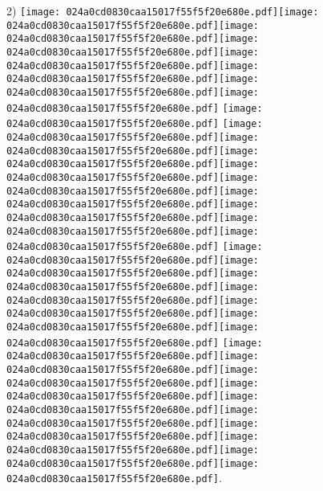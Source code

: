 \documentclass{article}
\newcommand{\origpg}[2]{\texttt{[image: 024a0cd0830caa15017f55f5f20e680e.pdf]}}
\begin{document}
{\vspace{0.385pt}\hspace{18.094pt}2) \origpg5{121.46pt 587.48pt 133.12pt 603.63pt}\origpg5{133.02pt 587.48pt 141.09pt 603.63pt}\origpg5{141.19pt 587.48pt 149.26pt 603.63pt}\hspace{-0.113pt}\origpg5{149.14pt 587.48pt 156.76pt 603.63pt}\origpg5{156.84pt 587.48pt 164.01pt 603.63pt}\hspace{-0.178pt}\origpg5{163.83pt 587.48pt 171.9pt 603.63pt}\hspace{-0.113pt}\origpg5{171.79pt 587.48pt 179.63pt 603.63pt}\hspace{-0.129pt}\origpg5{179.5pt 587.48pt 186.67pt 603.63pt} \origpg5{190.58pt 587.48pt 199.21pt 603.63pt} \origpg5{203.33pt 587.48pt 211.4pt 603.63pt}\hspace{-0.113pt}\origpg5{211.28pt 587.48pt 219.5pt 603.63pt}\hspace{-0.258pt}\origpg5{219.24pt 587.48pt 227.31pt 603.63pt}\origpg5{227.41pt 587.48pt 234.57pt 603.63pt}\origpg5{234.62pt 587.48pt 242.84pt 603.63pt}\origpg5{242.84pt 587.48pt 250.91pt 603.63pt}\hspace{-0.387pt}\origpg5{250.52pt 587.48pt 257.57pt 603.63pt}\origpg5{257.51pt 587.48pt 265.35pt 603.63pt}\hspace{-0.371pt}\origpg5{264.98pt 587.48pt 272.15pt 603.63pt} \origpg5{276.28pt 587.48pt 284.35pt 603.63pt}\hspace{-0.355pt}\origpg5{284pt 587.48pt 291.16pt 603.63pt}\origpg5{291.21pt 587.48pt 299.27pt 603.63pt}\origpg5{299.17pt 587.48pt 307.24pt 603.63pt}\hspace{-0.113pt}\origpg5{307.13pt 587.48pt 314.74pt 603.63pt}\origpg5{314.82pt 587.48pt 323.46pt 603.63pt}\origpg5{323.46pt 587.48pt 332.09pt 603.63pt} \origpg5{336.24pt 587.48pt 343.41pt 603.63pt}\origpg5{343.46pt 587.48pt 351.53pt 603.63pt}\hspace{-0.839pt}\origpg5{350.69pt 587.48pt 358.76pt 603.63pt}\hspace{-1.324pt}\origpg5{357.43pt 587.48pt 365.65pt 603.63pt}\origpg5{365.65pt 587.48pt 372.82pt 603.63pt}\origpg5{372.82pt 587.48pt 380.89pt 603.63pt}\hspace{0.145pt}\origpg5{381.03pt 587.48pt 388.2pt 603.63pt}\hspace{-0.178pt}\origpg5{388.02pt 587.48pt 396.66pt 603.63pt}\origpg5{396.66pt 587.48pt 405.29pt 603.63pt}\origpg5{405.36pt 587.48pt 412.78pt 603.63pt}. 

}
\end{document}
